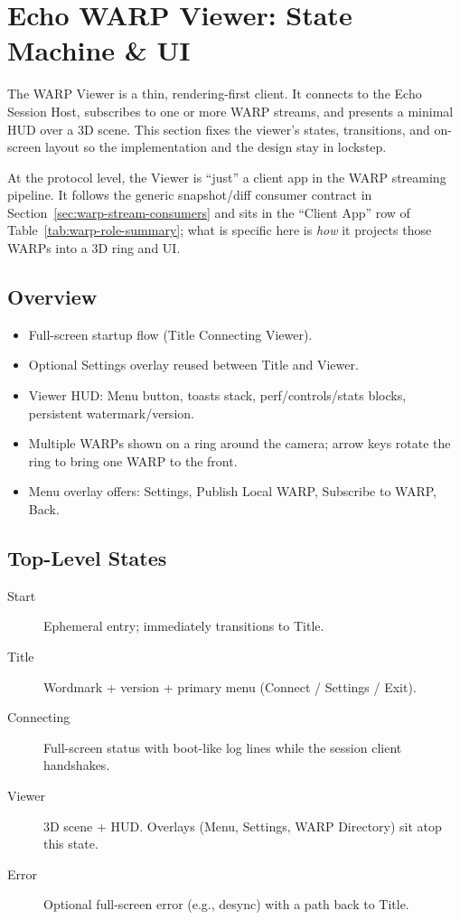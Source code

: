 \section{Echo WARP Viewer: State Machine \& UI}
\label{sec:warp-viewer}

The WARP Viewer is a thin, rendering-first client. It connects to the Echo Session Host, subscribes to one or more WARP streams, and presents a minimal HUD over a 3D scene. This section fixes the viewer's states, transitions, and on-screen layout so the implementation and the design stay in lockstep.

At the protocol level, the Viewer is ``just'' a client app in the WARP
streaming pipeline. It follows the generic snapshot/diff consumer contract in
Section~\ref{sec:warp-stream-consumers} and sits in the ``Client App'' row of
Table~\ref{tab:warp-role-summary}; what is specific here is \emph{how} it
projects those WARPs into a 3D ring and UI.

\subsection{Overview}
\begin{itemize}
  \item Full-screen startup flow (Title \textrightarrow{} Connecting \textrightarrow{} Viewer).
  \item Optional Settings overlay reused between Title and Viewer.
  \item Viewer HUD: Menu button, toasts stack, perf/controls/stats blocks, persistent watermark/version.
  \item Multiple WARPs shown on a ring around the camera; arrow keys rotate the ring to bring one WARP to the front.
  \item Menu overlay offers: Settings, Publish Local WARP, Subscribe to WARP, Back.
\end{itemize}

\subsection{Top-Level States}
\begin{description}
  \item[Start] Ephemeral entry; immediately transitions to Title.
  \item[Title] Wordmark + version + primary menu (Connect / Settings / Exit).
  \item[Connecting] Full-screen status with boot-like log lines while the session client handshakes.
  \item[Viewer] 3D scene + HUD. Overlays (Menu, Settings, WARP Directory) sit atop this state.
  \item[Error] Optional full-screen error (e.g., desync) with a path back to Title.
\end{description}

